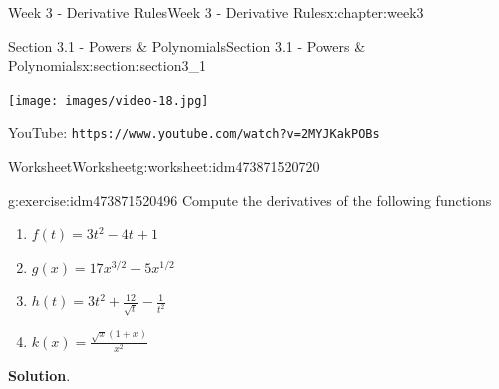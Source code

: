 \documentclass[oneside,10pt,]{book}
\newcommand{\blocktitlefont}{\relax}
\newcommand{\mono}[1]{\texttt{#1}}
\numberwithin{equation}{section}
\newlength{\qrsize}
\newlength{\previewwidth}
\begin{document}
\begin{chapterptx}{Week 3 - Derivative Rules}{}{Week 3 - Derivative Rules}{}{}{x:chapter:week3}
%
%
\typeout{************************************************}
\typeout{************************************************}
%
\begin{sectionptx}{Section 3.1 - Powers \& Polynomials}{}{Section 3.1 - Powers \& Polynomials}{}{}{x:section:section3_1}
\setlength{\qrsize}{9em}
\setlength{\previewwidth}{\linewidth}
\addtolength{\previewwidth}{-\qrsize}
\begin{tcbraster}[raster columns=2, raster column skip=1pt, raster halign=center, raster force size=false, raster left skip=0pt, raster right skip=0pt]%
\begin{tcolorbox}[previewstyle, width=\previewwidth]%
\texttt{[image: images/video-18.jpg]}%
\end{tcolorbox}%
\begin{tcolorbox}[qrstyle]%
{\hypersetup{urlcolor=black}}%
\end{tcolorbox}%
\begin{tcolorbox}[captionstyle]%
\small YouTube: \mono{https://www.youtube.com/watch?v=2MYJKakPOBs}\end{tcolorbox}%
\end{tcbraster}%
%
%
\typeout{************************************************}
\typeout{************************************************}
%
\begin{worksheet-subsection}{Worksheet}{}{Worksheet}{}{}{g:worksheet:idm473871520720}
\begin{divisionexercise}{1}{}{}{g:exercise:idm473871520496}%
Compute the derivatives of the following functions%
%
\begin{enumerate}[label=(\alph*)]
\item{}\(\displaystyle f(t) = 3t^2-4t+1\)%
\item{}\(\displaystyle g(x) = 17x^{3/2} - 5x^{1/2}\)%
\item{}\(\displaystyle h(t) = 3t^2 + \frac{12}{\sqrt t} - \frac{1}{t^2}\)%
\item{}\(\displaystyle k(x) = \frac{\sqrt x (1+x)}{x^2}\)%
\end{enumerate}
\textbf{\blocktitlefont Solution}.\hypertarget{g:solution:idm473871520368}{}\quad{}%
\begin{enumerate}[label=(\alph*)]

\end{enumerate}
\end{divisionexercise}
\end{worksheet-subsection}
\end{sectionptx}
\end{chapterptx}
\end{document}
